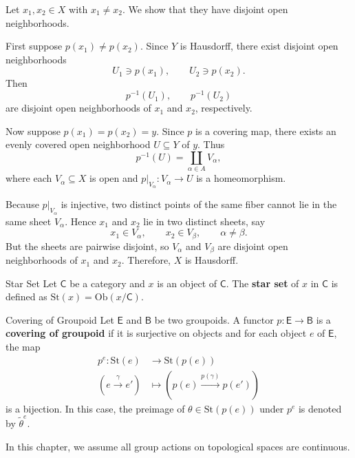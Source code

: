 \documentclass{report}
\begin{document}
\begin{prf}
	Let \(x_1,x_2\in X\) with \(x_1\neq x_2\). We show that they have disjoint open neighborhoods.

	First suppose \(p(x_1)\neq p(x_2)\). Since \(Y\) is Hausdorff, there exist disjoint open neighborhoods
	\[
		U_1\ni p(x_1),\qquad U_2\ni p(x_2).
	\]
	Then
	\[
		p^{-1}(U_1),\qquad p^{-1}(U_2)
	\]
	are disjoint open neighborhoods of \(x_1\) and \(x_2\), respectively.

	Now suppose \(p(x_1)=p(x_2)=y\). Since \(p\) is a covering map, there exists an evenly covered open neighborhood
	\(U\subseteq Y\) of \(y\). Thus
	\[
		p^{-1}(U)=\coprod_{\alpha\in A} V_\alpha,
	\]
	where each \(V_\alpha\subseteq X\) is open and $p|_{V_\alpha}:V_\alpha\to U$ is a homeomorphism.

	Because \(p|_{V_\alpha}\) is injective, two distinct points of the same fiber cannot lie in the same sheet \(V_\alpha\). Hence \(x_1\) and \(x_2\) lie in two distinct sheets, say
	\[
		x_1\in V_\alpha,\qquad x_2\in V_\beta,\qquad \alpha\neq\beta.
	\]
	But the sheets are pairwise disjoint, so \(V_\alpha\) and \(V_\beta\) are disjoint open neighborhoods of \(x_1\) and \(x_2\). Therefore, \(X\) is Hausdorff.
\end{prf}

\begin{definition}{Star Set}{}
	Let $\mathsf{C}$ be a category and $x$ is an object of $\mathsf{C}$. The \textbf{star set} of $x$ in $\mathsf{C}$ is defined as
	$\mathrm{St}(x)=\mathrm{Ob}\left(x/\mathsf{C}\right)$.
\end{definition}

\begin{definition}{Covering of Groupoid}{}
	Let $\mathsf{E}$ and $\mathsf{B}$ be two groupoids. A functor $p:\mathsf{E}\to\mathsf{B}$ is a \textbf{covering of groupoid} if it is surjective on objects and for each object $e$ of $\mathsf{E}$, the map
	\begin{align*}
		p^{e}:\mathrm{St}(e)                  & \longrightarrow\mathrm{St}(p(e))                           \\
		\left(e\xrightarrow{\gamma} e'\right) & \longmapsto \left(p(e)\xrightarrow{p(\gamma)} p(e')\right)
	\end{align*}
	is a bijection. In this case, the preimage of $\theta\in\mathrm{St}(p(e))$ under $p^{e}$ is denoted by $\widetilde{\theta}^e$.
\end{definition}

In this chapter, we assume all group actions on topological spaces are continuous.
\end{document}
